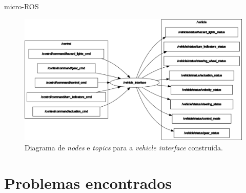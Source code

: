 \documentclass{if-beamer}
\begin{document}
\begin{frame}{micro-ROS}

	\begin{figure}[H]
		\centering
		\includegraphics[width=0.85\linewidth]{rosgraph}
		\caption{Diagrama de \textit{nodes} e \textit{topics} para a \textit{vehicle interface} construída.}
		\label{fig:rosgraph}
	\end{figure}

\end{frame}

\section{Problemas encontrados}
\end{document}
